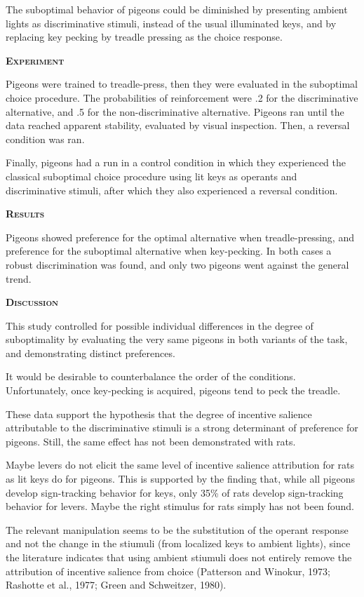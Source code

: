 \documentclass[a4paper,12pt]{article}
\begin{document}
The suboptimal behavior of pigeons could be diminished by presenting ambient lights as discriminative stimuli, instead of the usual illuminated keys, and by replacing key pecking by treadle pressing as the choice response.

{\scshape\bfseries Experiment}

Pigeons were trained to treadle-press, then they were evaluated in the suboptimal choice procedure. The probabilities of reinforcement were .2 for the discriminative alternative, and .5 for the non-discriminative alternative. Pigeons ran until the data reached apparent stability, evaluated by visual inspection. Then, a reversal condition was ran.

Finally, pigeons had a run in a control condition in which they experienced the classical suboptimal choice procedure using lit keys as operants and discriminative stimuli, after which they also experienced a reversal condition.

{\scshape\bfseries Results}

Pigeons showed preference for the optimal alternative when treadle-pressing, and preference for the suboptimal alternative when key-pecking. In both cases a robust discrimination was found, and only two pigeons went against the general trend.

{\scshape\bfseries Discussion}

This study controlled for possible individual differences in the degree of suboptimality by evaluating the very same pigeons in both variants of the task, and demonstrating distinct preferences.

It would be desirable to counterbalance the order of the conditions. Unfortunately, once key-pecking is acquired, pigeons tend to peck the treadle.

These data support the hypothesis that the degree of incentive salience attributable to the discriminative stimuli is a strong determinant of preference for pigeons. Still, the same effect has not been demonstrated with rats.

Maybe levers do not elicit the same level of incentive salience attribution for rats as lit keys do for pigeons. This is supported by the finding that, while all pigeons develop sign-tracking behavior for keys, only 35\% of rats develop sign-tracking behavior for levers. Maybe the right stimulus for rats simply has not been found.

The relevant manipulation seems to be the substitution of the operant response and not the change in the stiumuli (from localized keys to ambient lights), since the literature indicates that using ambient stiumuli does not entirely remove the attribution of incentive salience from choice (Patterson and Winokur, 1973; Rashotte et al., 1977; Green and Schweitzer, 1980).
\end{document}
